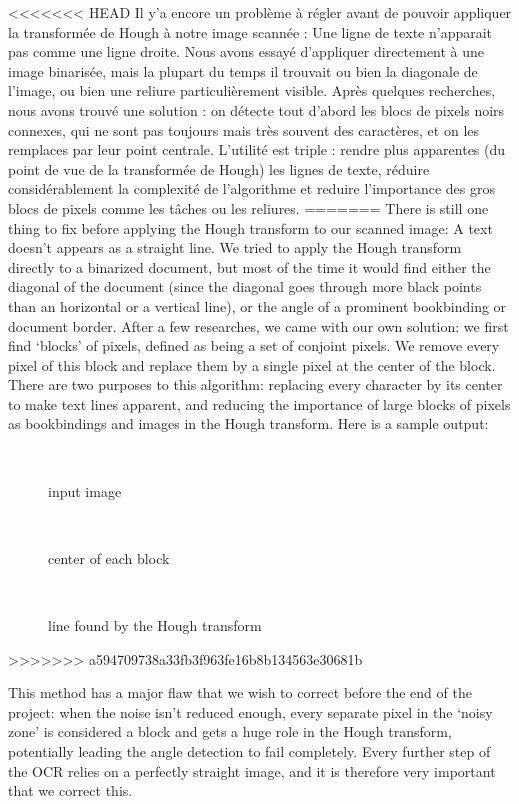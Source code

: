 <<<<<<< HEAD
Il y'a encore un problème à régler avant de pouvoir appliquer la transformée de Hough à notre image scannée : Une ligne de texte n'apparait pas comme une ligne droite. Nous avons essayé d'appliquer directement à une image binarisée, mais la plupart du temps il trouvait ou bien la diagonale de l'image, ou bien une reliure particulièrement visible. Après quelques recherches, nous avons trouvé une solution : on détecte tout d'abord les blocs de pixels noirs connexes, qui ne sont pas toujours mais très souvent des caractères, et on les remplaces par leur point centrale. L'utilité est triple : rendre plus apparentes (du point de vue de la transformée de Hough) les lignes de texte, réduire considérablement la complexité de l'algorithme et reduire l'importance des gros blocs de pixels comme les tâches ou les reliures.
=======
There is still one thing to fix before applying the Hough transform to our
scanned image: A text doesn't appears as a straight line. We tried to apply the
Hough transform directly to a binarized document, but most of the time it would
find either the diagonal of the document (since the diagonal goes through more
black points than an horizontal or a vertical line), or the angle of a prominent
bookbinding or document border. After a few researches, we came with our own
solution: we first find `blocks' of pixels, defined as being a set of conjoint
pixels. We remove every pixel of this block and replace them by a single pixel
at the center of the block. There are two purposes to this algorithm: replacing
every character by its center to make text lines apparent, and reducing the
importance of large blocks of pixels as bookbindings and images in the Hough
transform. Here is a sample output:\\

\begin{figure}[h!]\
    \centering
    \caption{input image}
\end{figure}
\begin{figure}[h!]\
    \centering
    \caption{center of each block}
\end{figure}
\begin{figure}[h!]\
    \centering
    \caption{line found by the Hough transform}
\end{figure}
>>>>>>> a594709738a33fb3f963fe16b8b134563e30681b

This method has a major flaw that we wish to correct before the end of the
project: when the noise isn't reduced enough, every separate pixel in the
`noisy zone' is considered a block and gets a huge role in the Hough transform,
potentially leading the angle detection to fail completely. Every further step
of the OCR relies on a perfectly straight image, and it is therefore very
important that we correct this. \\

